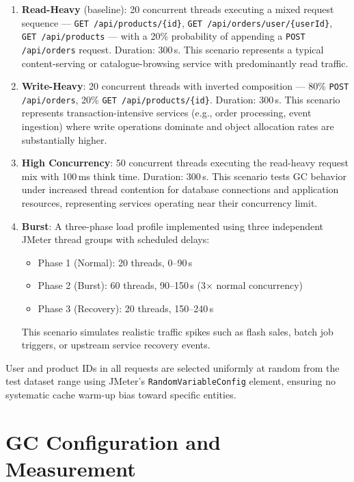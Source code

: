 \begin{enumerate}
    \item \textbf{Read-Heavy} (baseline): 20 concurrent threads executing a mixed request sequence --- \texttt{GET /api/products/\{id\}}, \texttt{GET /api/orders/user/\{userId\}}, \texttt{GET /api/products} --- with a 20\% probability of appending a \texttt{POST /api/orders} request. Duration: 300\,s. This scenario represents a typical content-serving or catalogue-browsing service with predominantly read traffic.

    \item \textbf{Write-Heavy}: 20 concurrent threads with inverted composition --- 80\% \texttt{POST /api/orders}, 20\% \texttt{GET /api/products/\{id\}}. Duration: 300\,s. This scenario represents transaction-intensive services (e.g., order processing, event ingestion) where write operations dominate and object allocation rates are substantially higher.

    \item \textbf{High Concurrency}: 50 concurrent threads executing the read-heavy request mix with 100\,ms think time. Duration: 300\,s. This scenario tests GC behavior under increased thread contention for database connections and application resources, representing services operating near their concurrency limit.

    \item \textbf{Burst}: A three-phase load profile implemented using three independent JMeter thread groups with scheduled delays:
    \begin{itemize}
        \item Phase 1 (Normal): 20 threads, 0--90\,s
        \item Phase 2 (Burst): 60 threads, 90--150\,s (3$\times$ normal concurrency)
        \item Phase 3 (Recovery): 20 threads, 150--240\,s
    \end{itemize}
    This scenario simulates realistic traffic spikes such as flash sales, batch job triggers, or upstream service recovery events.
\end{enumerate}

User and product IDs in all requests are selected uniformly at random from the test dataset range using JMeter's \texttt{RandomVariableConfig} element, ensuring no systematic cache warm-up bias toward specific entities.

\section{GC Configuration and Measurement}
\label{sec:measurement}

